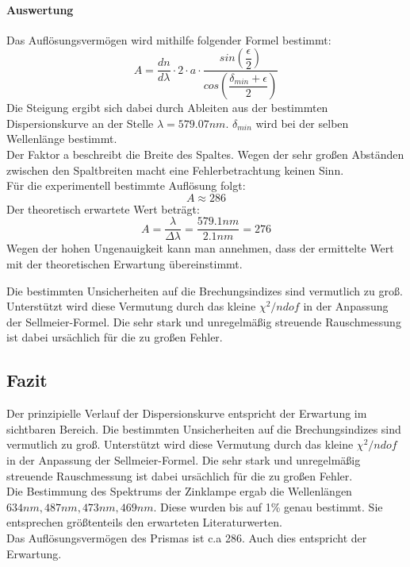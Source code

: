 \documentclass[12pt,a4paper]{article}
\begin{document}
	\paragraph{Auswertung}
	Das Auflösungsvermögen wird mithilfe folgender Formel bestimmt:
	\begin{equation}
	A = \dfrac{dn}{d\lambda}\cdot 2\cdot a\cdot\dfrac{sin\left(\dfrac{\epsilon}{2}\right)}{cos\left(\dfrac{\delta_{min}+\epsilon}{2}\right)}
	\end{equation}
	Die Steigung ergibt sich dabei durch Ableiten aus der bestimmten Dispersionskurve an der Stelle $\lambda = 579.07 nm$. $\delta_{min}$ wird bei der selben Wellenlänge bestimmt.\\
	Der Faktor a beschreibt die Breite des Spaltes.
	Wegen der sehr großen Abständen zwischen den Spaltbreiten macht eine Fehlerbetrachtung keinen Sinn.\\
	Für die experimentell bestimmte Auflösung folgt:
	\begin{equation}
	A \approx 286
	\end{equation}
	Der theoretisch erwartete Wert beträgt:
	\begin{equation}
	A = \dfrac{\lambda}{\Delta \lambda} = \dfrac{579.1 nm}{2.1 nm} = 276
	\end{equation}
	Wegen der hohen Ungenauigkeit kann man annehmen, dass der ermittelte Wert mit der theoretischen Erwartung übereinstimmt.
	
	
	
	Die bestimmten Unsicherheiten auf die Brechungsindizes sind vermutlich zu groß. Unterstützt wird diese Vermutung durch das kleine $\chi^2/ndof$ in der Anpassung der Sellmeier-Formel.
	Die sehr stark und unregelmäßig streuende Rauschmessung ist dabei ursächlich für die zu großen Fehler.
\subsection{Fazit}
Der prinzipielle Verlauf der Dispersionskurve entspricht der Erwartung im sichtbaren Bereich.
Die bestimmten Unsicherheiten auf die Brechungsindizes sind vermutlich zu groß. Unterstützt wird diese Vermutung durch das kleine $\chi^2/ndof$ in der Anpassung der Sellmeier-Formel.
Die sehr stark und unregelmäßig streuende Rauschmessung ist dabei ursächlich für die zu großen Fehler.\\
Die Bestimmung des Spektrums der Zinklampe ergab die Wellenlängen $634nm, 487nm, 473 nm, 469nm $. Diese wurden bis auf 1\% genau bestimmt. Sie entsprechen größtenteils den erwarteten Literaturwerten.\\
Das Auflösungsvermögen des Prismas ist c.a 286. Auch dies entspricht der Erwartung.
	
\end{document}
